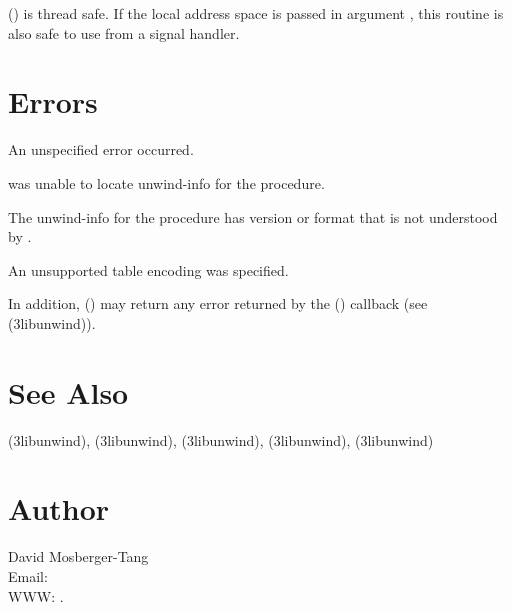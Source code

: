 \documentclass{article}
\begin{document}
() is thread safe.  If the local
address space is passed in argument , this routine is also
safe to use from a signal handler.

\section{Errors}

\begin{Description}
\item[\Const{UNW\_EUNSPEC}] An unspecified error occurred.
\item[\Const{UNW\_ENOINFO}]  was unable to locate
  unwind-info for the procedure.
\item[\Const{UNW\_EBADVERSION}] The unwind-info for the procedure has
  version or format that is not understood by .
\item[\Const{UNW\_EINVAL}] An unsupported table encoding was specified.
\end{Description}
In addition, () may return any
error returned by the () callback (see
(3libunwind)).

\section{See Also}

(3libunwind),
(3libunwind),
(3libunwind),
(3libunwind),
(3libunwind)

\section{Author}

\noindent
David Mosberger-Tang\\
Email: \\
WWW: .
\LatexManEnd
\end{document}
